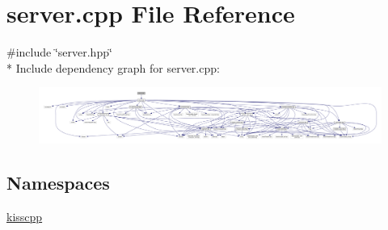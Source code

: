\hypertarget{a00076}{\section{server.\-cpp File Reference}
\label{a00076}
}
{\ttfamily \#include \char`\"{}server.\-hpp\char`\"{}}\\*
Include dependency graph for server.\-cpp\-:\nopagebreak
\begin{figure}[H]
\begin{center}
\leavevmode
\includegraphics[width=350pt]{a00122}
\end{center}
\end{figure}
\subsection*{Namespaces}
\begin{DoxyCompactItemize}
\item 
\hyperlink{a00089}{kisscpp}
\end{DoxyCompactItemize}
